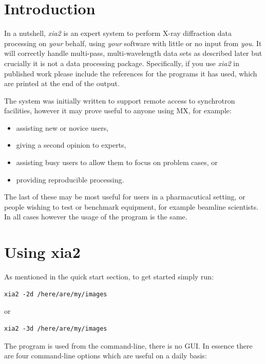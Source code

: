 \documentclass[a4paper, 11pt]{article}
\begin{document}
\section{Introduction}

In a nutshell, \emph{xia2} is an expert system to perform X-ray diffraction
data processing on \emph{your} behalf, using \emph{your} software with little
or no input from \emph{you}. It will correctly handle multi-pass, 
multi-wavelength data sets as described later but crucially it is not a
data processing package. Specifically, if you use \emph{xia2} in published
work please include the references for the programs it has used, which are
printed at the end of the output.

The system was initially written to support remote access to synchrotron 
facilities, however it may prove useful to anyone using MX, for example:

\begin{itemize}
\item{assisting new or novice users,}
\item{giving a second opinion to experts,}
\item{assisting busy users to allow them to focus on problem cases, or}
\item{providing reproducible processing.}
\end{itemize}

\noindent
The last of these may be most useful for users in a pharmacutical setting,
or people wishing to test or benchmark equipment, for example beamline 
scientists. In all cases however the usage of the program is the same.

\section{Using xia2}

As mentioned in the quick start section, to get started simply run:

\begin{verbatim}
xia2 -2d /here/are/my/images
\end{verbatim}

\noindent
or

\begin{verbatim}
xia2 -3d /here/are/my/images
\end{verbatim}

The program is used from the command-line, there is no GUI. In essence there
are four command-line options which are useful on a daily basis:
\end{document}
